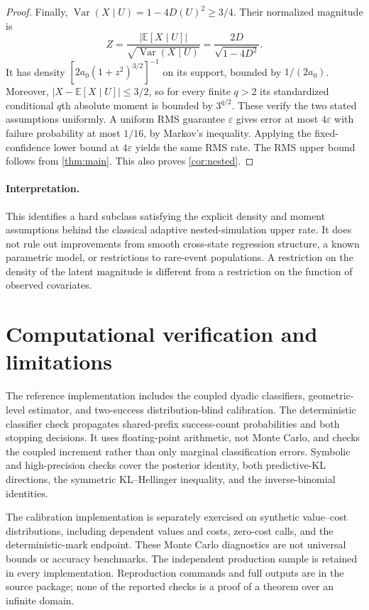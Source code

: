\documentclass[11pt,a4paper]{article}
\theoremstyle{definition}
\newcommand{\E}{\mathbb E}
\newcommand{\Var}{\operatorname{Var}}
\begin{document}
\begin{proof}
Finally, $\Var(X\mid U)=1-4D(U)^2\ge3/4$. Their normalized magnitude is
\[
Z=\frac{|\E[X\mid U]|}{\sqrt{\Var(X\mid U)}}
=\frac{2D}{\sqrt{1-4D^2}}.
\]
It has density $[2a_0(1+z^2)^{3/2}]^{-1}$ on its support, bounded by $1/(2a_0)$. Moreover, $|X-\E[X\mid U]|\le3/2$, so for every finite $q>2$ its standardized conditional $q$th absolute moment is bounded by $3^{q/2}$. These verify the two stated assumptions uniformly.
A uniform RMS guarantee $\varepsilon$ gives error at most
$4\varepsilon$ with failure probability at most $1/16$, by Markov's
inequality. Applying the fixed-confidence lower bound at $4\varepsilon$
yields the same RMS rate. The RMS upper bound follows from
\cref{thm:main}. This also proves \cref{cor:nested}.
\end{proof}

\paragraph{Interpretation.}
This identifies a hard subclass satisfying the explicit density and moment assumptions behind the classical adaptive nested-simulation upper rate. It does not rule out improvements from smooth cross-state regression structure, a known parametric model, or restrictions to rare-event populations. A restriction on the density of the latent magnitude is different from a restriction on the function of observed covariates.


\section{Computational verification and limitations}\label{sec:verification}
The reference implementation includes the coupled dyadic classifiers,
geometric-level estimator, and two-success distribution-blind calibration.
The deterministic classifier check propagates shared-prefix success-count
probabilities and both stopping decisions. It uses floating-point arithmetic,
not Monte Carlo, and checks the coupled increment rather than only marginal
classification errors. Symbolic and high-precision checks cover the posterior
identity, both predictive-KL directions, the symmetric KL--Hellinger inequality,
and the inverse-binomial identities.



The calibration implementation is separately exercised on synthetic
value--cost distributions, including dependent values and costs, zero-cost
calls, and the deterministic-mark endpoint. These Monte Carlo diagnostics
are not universal bounds or accuracy benchmarks. The independent production
sample is retained in every implementation. Reproduction commands and full
outputs are in the source package; none of the reported checks is a proof
of a theorem over an infinite domain.
\end{document}

